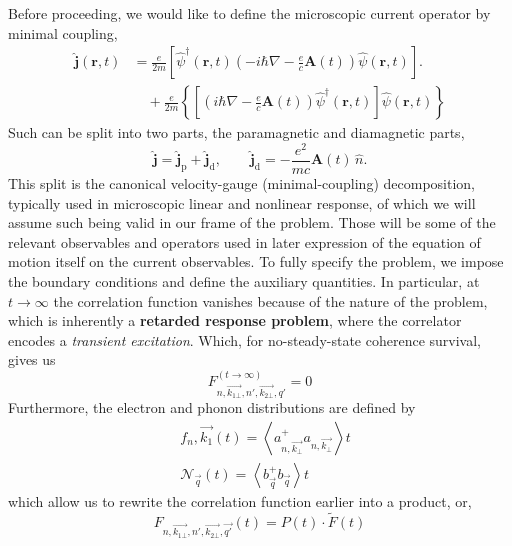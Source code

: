 \documentclass[%
 reprint,
 amsmath,amssymb,
 aps,
]{revtex4-2}
\begin{document}
Before proceeding, we would like to define the microscopic current operator by minimal coupling,
\begin{equation}\label{eq:current_a}
\begin{split}
\hat{\mathbf j}(\mathbf r,t)
&=
\frac{e}{2m}
\left[
\hat\psi^\dagger(\mathbf r,t)
\left(-i\hbar\nabla-\frac{e}{c}\mathbf A(t)\right)
\hat\psi(\mathbf r,t)
\right].
\\
&\quad
+
\frac{e}{2m}
\left\{
\left[
\left(i\hbar\nabla-\frac{e}{c}\mathbf A(t)\right)
\hat\psi^\dagger(\mathbf r,t)
\right]
\hat\psi(\mathbf r,t)
\right\}
\end{split}
\end{equation}
Such can be split into two parts, the paramagnetic and diamagnetic parts,
\begin{equation}
    \hat{\mathbf j}=\hat{\mathbf j}_{\text{p}}+\hat{\mathbf j}_{\text{d}},
\qquad
\hat{\mathbf j}_{\text{d}}=-\frac{e^2}{mc}\mathbf A(t)\,\hat n.
\end{equation}
This split is the canonical velocity-gauge (minimal-coupling) decomposition, typically used in microscopic linear and nonlinear response, of which we will assume such being valid in our frame of the problem. Those will be some of the relevant observables and operators used in later expression of the equation of motion itself on the current observables.
To fully specify the problem, we impose the boundary conditions and define the auxiliary quantities. In particular, at $t\to \infty$ the correlation function vanishes because of the nature of the problem, which is inherently a \textbf{retarded response problem}, where the correlator encodes a \textit{transient excitation}. Which, for no-steady-state coherence survival, gives us
\begin{equation}
    F_{n,\vec{k_{1\bot}}, n', \vec{k_{2\bot}},q'}^{(t \to \infty )} = 0 
\end{equation}
Furthermore, the electron and phonon distributions are defined by
\begin{align*}
    & f_n, \vec{k_{1}}(t) = \left \langle a^+_{n, \vec{k_{\bot}}}a_{n, \vec{k_\bot}} \right \rangle t \\
    & \mathcal{N}_{\vec{q}}(t) = \left\langle b^+_{\vec{q}} b_{\vec{q}} \right\rangle t
\end{align*}
which allow us to rewrite the correlation function earlier into a product, or, 
\begin{equation}
    F_{n, \vec{k_{1\bot}}, n', \vec{k_{2\bot}}, \vec{q'}}{(t)}= P(t) \cdot \tilde{F} (t)
\end{equation}
\end{document}

